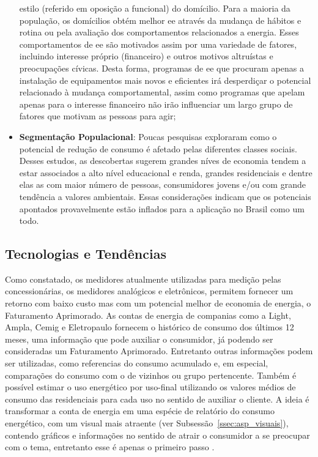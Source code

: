 \begin{itemize}
estilo (referido em oposição a funcional) do domícilio. Para a maioria da
população, os domícilios obtém melhor \gls{ee} através da mudança de hábitos e 
rotina ou pela avaliação dos comportamentos relacionados a energia. Esses
comportamentos de \gls{ee} são motivados assim por uma variedade de fatores,
incluindo interesse próprio (financeiro) e outros motivos altruístas e
preocupações cívicas. Desta forma, programas de \gls{ee} que procuram apenas 
a instalação de equipamentos mais novos e eficientes irá
desperdiçar o potencial relacionado à mudança comportamental, assim como
programas que apelam apenas para o interesse financeiro não irão influenciar um
largo grupo de fatores que motivam as pessoas para agir;
\item \textbf{Segmentação Populacional}: Poucas pesquisas exploraram como o
potencial de redução de consumo é afetado pelas diferentes classes sociais.
Desses estudos, as descobertas sugerem grandes níves de economia tendem a estar
associados a alto nível educacional e renda, grandes residenciais e dentre elas
as com maior número de pessoas, consumidores jovens e/ou com grande tendência a
valores ambientais. Essas considerações indicam que os potenciais apontados
provavelmente estão inflados para a aplicação no Brasil como um todo.
\end{itemize} 

\subsection{Tecnologias e Tendências}
\label{ssec:ret_tec}

Como constatado, os medidores atualmente utilizadas para medição pelas 
concessionárias, os medidores analógicos e eletrônicos, permitem fornecer um 
retorno com baixo custo mas com um potencial melhor de economia de energia, 
o Faturamento Aprimorado. As contas de energia de companias como a Light,
Ampla, Cemig e Eletropaulo fornecem o histórico de consumo dos últimos 12 meses,
uma informação que pode auxiliar o consumidor, já podendo ser consideradas um 
Faturamento Aprimorado. Entretanto outras informações podem ser utilizadas, 
como referencias do consumo acumulado e, em especial, comparações do consumo 
com o de vizinhos ou grupo pertencente. Também é possível estimar o uso 
energético por uso-final utilizando os valores médios de consumo das residenciais
para cada uso no sentido de auxiliar o cliente. A ideia é
transformar a conta de energia em uma espécie de relatório do consumo energético,
com um visual mais atraente (ver Subsessão~\ref{ssec:asp_visuais}), 
contendo gráficos e informações no sentido de
atrair o consumidor a se preocupar com o tema, entretanto esse é apenas o
primeiro passo \cite{2009_epri}.

